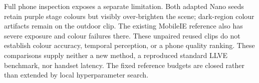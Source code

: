 Full phone inspection exposes a separate limitation. Both adapted Nano
seeds retain purple stage colours but visibly over-brighten the scene;
dark-region colour artifacts remain on the outdoor clip. The existing
MobileIE reference also has severe exposure and colour failures there.
These unpaired reused clips do not establish colour accuracy, temporal
perception, or a phone quality ranking. These comparisons supply neither a
new method, a reproduced standard LLVE benchmark, nor handset latency. The
fixed reference budgets are closed rather than extended by local
hyperparameter search.

